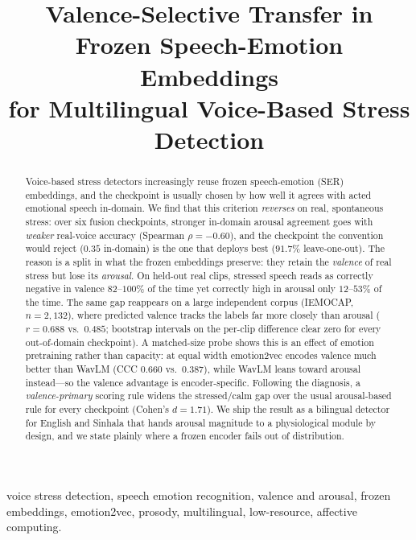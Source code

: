 \documentclass[conference]{IEEEtran}
\begin{document}
\title{Valence-Selective Transfer in Frozen Speech-Emotion Embeddings\\
for Multilingual Voice-Based Stress Detection}

\author{}

\maketitle

\begin{abstract}
Voice-based stress detectors increasingly reuse frozen speech-emotion (SER)
embeddings, and the checkpoint is usually chosen by how well it agrees with acted
emotional speech in-domain. We find that this criterion \emph{reverses} on real,
spontaneous stress: over six fusion checkpoints, stronger in-domain arousal
agreement goes with \emph{weaker} real-voice accuracy (Spearman $\rho = -0.60$),
and the checkpoint the convention would reject ($0.35$ in-domain) is the one that
deploys best ($91.7\%$ leave-one-out). The reason is a split in what the frozen
embeddings preserve: they retain the \emph{valence} of real stress but lose its
\emph{arousal}. On held-out real clips, stressed speech reads as correctly
negative in valence $82$--$100\%$ of the time yet correctly high in arousal only
$12$--$53\%$ of the time. The same gap reappears on a large independent corpus
(IEMOCAP, $n = 2{,}132$), where predicted valence tracks the labels far more
closely than arousal ($r = 0.688$ vs.\ $0.485$; bootstrap intervals on the
per-clip difference clear zero for every out-of-domain checkpoint). A
matched-size probe shows this is an effect of emotion pretraining rather than
capacity: at equal width emotion2vec encodes valence much better than WavLM
(CCC $0.660$ vs.\ $0.387$), while WavLM leans toward arousal instead---so the
valence advantage is encoder-specific. Following the diagnosis, a
\emph{valence-primary} scoring rule widens the stressed/calm gap over the usual
arousal-based rule for every checkpoint (Cohen's $d = 1.71$). We ship the result
as a bilingual detector for English and Sinhala that hands arousal magnitude to a
physiological module by design, and we state plainly where a frozen encoder
fails out of distribution.
\end{abstract}

\begin{IEEEkeywords}
voice stress detection, speech emotion recognition, valence and arousal,
frozen embeddings, emotion2vec, prosody, multilingual, low-resource,
affective computing.
\end{IEEEkeywords}
\end{document}
